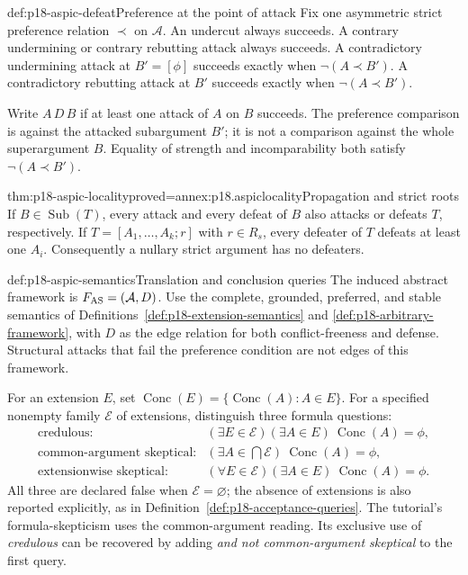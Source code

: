 \begin{hbdefinition}{def:p18-aspic-defeat}{Preference at the point of attack}
Fix one asymmetric strict preference relation \(\prec\) on \(\mathcal A\).
An undercut always succeeds. A contrary undermining or contrary rebutting
attack always succeeds. A contradictory undermining attack at
\(B'=[\phi]\) succeeds exactly when \(\neg(A\prec B')\).
A contradictory rebutting attack at \(B'\) succeeds exactly when
\(\neg(A\prec B')\).

Write \(A\,D\,B\) if at least one attack of \(A\) on \(B\) succeeds.
The preference comparison is against the attacked subargument \(B'\);
it is not a comparison against the whole superargument \(B\).
Equality of strength and incomparability both satisfy
\(\neg(A\prec B')\).
\end{hbdefinition}

\begin{hblemma}{thm:p18-aspic-locality}{proved=annex:p18.aspiclocality}{Propagation and strict roots}
If \(B\in\operatorname{Sub}(T)\), every attack and every defeat of \(B\)
also attacks or defeats \(T\), respectively.
If \(T=[A_1,\ldots,A_k;r]\) with \(r\in R_s\), every defeater of \(T\)
defeats at least one \(A_i\). Consequently a nullary strict argument has
no defeaters.
\end{hblemma}

\begin{hbdefinition}{def:p18-aspic-semantics}{Translation and conclusion queries}
The induced abstract framework is \(F_{\rm AS}=(\mathcal A,D)\).
Use the complete, grounded, preferred, and stable semantics of
Definitions~\ref{def:p18-extension-semantics} and
\ref{def:p18-arbitrary-framework}, with \(D\) as the edge relation for
both conflict-freeness and defense. Structural attacks that fail the
preference condition are not edges of this framework.

For an extension \(E\), set
\(\operatorname{Conc}(E)=\{\operatorname{Conc}(A):A\in E\}\).
For a specified nonempty family \(\mathcal E\) of extensions, distinguish
three formula questions:
\[
\begin{array}{ll}
\text{credulous:}&
  (\exists E\in\mathcal E)(\exists A\in E)\
                  \operatorname{Conc}(A)=\phi,\\
\text{common-argument skeptical:}&
  (\exists A\in\bigcap\mathcal E)\
                  \operatorname{Conc}(A)=\phi,\\
\text{extensionwise skeptical:}&
  (\forall E\in\mathcal E)(\exists A\in E)\
                  \operatorname{Conc}(A)=\phi .
\end{array}
\]
All three are declared false when \(\mathcal E=\varnothing\); the absence
of extensions is also reported explicitly, as in
Definition~\ref{def:p18-acceptance-queries}.
The tutorial's formula-skepticism uses the common-argument reading.
Its exclusive use of \emph{credulous} can be recovered by adding
\emph{and not common-argument skeptical} to the first query.
\end{hbdefinition}

